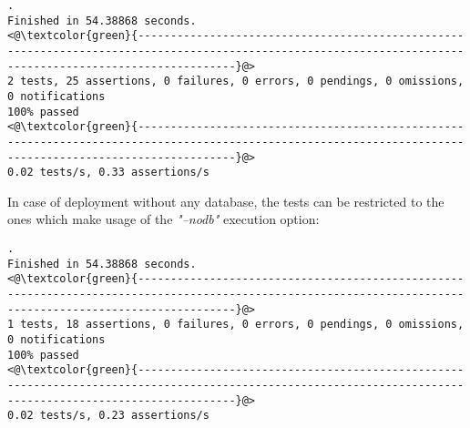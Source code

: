 \documentclass[dec_sum_main.tex]{subfiles}
\begin{document}
 \newline

\begin{lstlisting}
.
Finished in 54.38868 seconds.
<@\textcolor{green}{-----------------------------------------------------------------------------------------------------------------------------------------------------------}@>
2 tests, 25 assertions, 0 failures, 0 errors, 0 pendings, 0 omissions, 0 notifications
100% passed
<@\textcolor{green}{-----------------------------------------------------------------------------------------------------------------------------------------------------------}@>
0.02 tests/s, 0.33 assertions/s 
\end{lstlisting}

\noindent
\newline
In case of deployment without any database, the tests can be restricted to the ones which make usage of the \textit{"--nodb"} execution option:

 \newline

\begin{lstlisting}
.
Finished in 54.38868 seconds.
<@\textcolor{green}{-----------------------------------------------------------------------------------------------------------------------------------------------------------}@>
1 tests, 18 assertions, 0 failures, 0 errors, 0 pendings, 0 omissions, 0 notifications
100% passed
<@\textcolor{green}{-----------------------------------------------------------------------------------------------------------------------------------------------------------}@>
0.02 tests/s, 0.23 assertions/s
\end{lstlisting}
\end{document}
